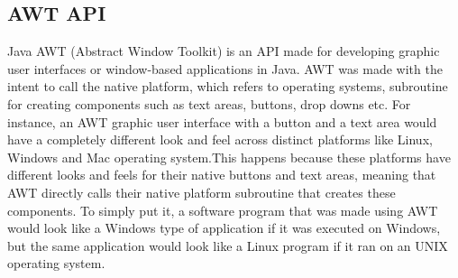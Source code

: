 \documentclass[12pt,a4paper]{report}
\begin{document}
\subsection{AWT API}
Java AWT (Abstract Window Toolkit) is an API made for developing graphic user interfaces or window-based applications in Java. AWT was made with the intent to call the native platform, which refers to operating systems, subroutine for creating components such as text areas, buttons, drop downs etc. For instance, an AWT graphic user interface with a button and a text area would have a completely different look and feel across distinct platforms like Linux, Windows and Mac operating system.This happens because these platforms have different looks and feels for their native buttons and text areas, meaning that AWT directly calls their native platform subroutine that creates these components. To simply put it, a software program that was made using AWT would look like a Windows type of application if it was executed on Windows, but the same application would look like a Linux program if it ran on an UNIX operating system.
\end{document}
